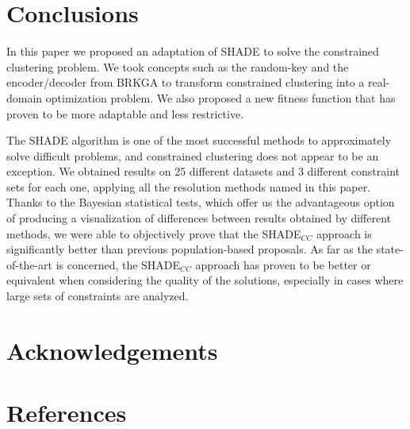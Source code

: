 \documentclass[review]{elsarticle}
\begin{document}
\section{Conclusions} \label{sec:conclusiones}

In this paper we proposed an adaptation of SHADE to solve the constrained clustering problem. We took concepts such as the random-key and the encoder/decoder from BRKGA to transform constrained clustering into a real-domain optimization problem. We also proposed a new fitness function that has proven to be more adaptable and less restrictive.

The SHADE algorithm is one of the most successful methods to approximately solve difficult problems, and constrained clustering does not appear to be an exception. We obtained results on 25 different datasets and 3 different constraint sets for each one, applying all the resolution methods named in this paper. Thanks to the Bayesian statistical tests, which offer us the advantageous option of producing a visualization of differences between results obtained by different methods, we were able to objectively prove that the SHADE$_{CC}$ approach is significantly better than previous population-based proposals. As far as the state-of-the-art is concerned, the SHADE$_{CC}$ approach has proven to be better or equivalent when considering the quality of the solutions, especially in cases where large sets of constraints are analyzed.

\section{Acknowledgements}

\clearpage

\section*{References}


\end{document}
